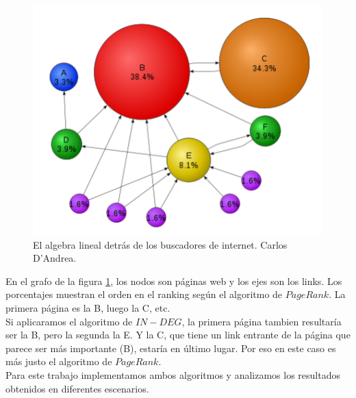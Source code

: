 \begin{figure}
  \vspace{-20pt}
  \begin{center}
    \includegraphics[scale= 0.6]{imagenes/ejemplo-grafo-1.png}
  \end{center}
  \vspace{-20pt}
   \caption[Caption for LOF]{El algebra lineal detrás de los buscadores de internet. Carlos D'Andrea.\footnotemark}
  \vspace{-10pt}
  \label{fig:img1}
\end{figure}




En el grafo de la figura \ref{fig:img1}, los nodos son páginas web y los ejes son los links. Los porcentajes muestran el orden en el ranking según el algoritmo de $PageRank$. La primera página es la B, luego la C, etc.\\

 Si aplicaramos el algoritmo de $IN-DEG$, la primera página tambien resultaría ser la B, pero la segunda la E. Y la C, que tiene un link entrante de la página que parece ser más importante (B), estaría en último lugar. Por eso en este caso es más justo el algoritmo de $PageRank$.\\

Para este trabajo implementamos ambos algoritmos y analizamos los resultados obtenidos en diferentes escenarios.\\

